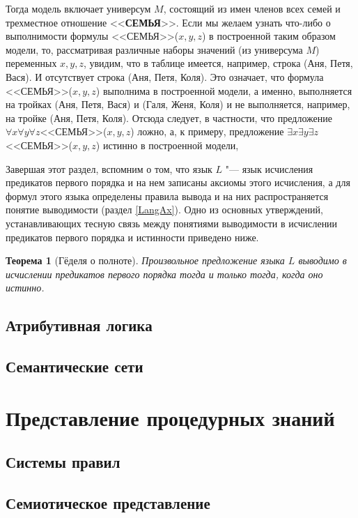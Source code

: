 \documentclass[b5paper,11pt]{book}
\newtheorem{Th}{Теорема}
\numberwithin{Def}{section}
\numberwithin{Th}{chapter}
\numberwithin{St}{chapter}
\begin{document}
	Тогда модель включает универсум $M$, состоящий из имен членов всех семей и трехместное отношение <<\textbf{СЕМЬЯ}>>. Если мы желаем узнать что-либо о выполнимости формулы <<СЕМЬЯ>>($x,y,z$) в построенной таким образом модели, то, рассматривая различные наборы значений (из универсума $M$) переменных $x,y,z$, увидим, что в таблице имеется, например, строка (Аня, Петя, Вася). И отсутствует строка (Аня, Петя, Коля). Это означает, что формула <<СЕМЬЯ>>($x,y,z$) выполнима  в построенной модели, а именно, выполняется на тройках (Аня, Петя, Вася) и (Галя, Женя, Коля) и не выполняется, например, на тройке (Аня, Петя, Коля). Отсюда следует, в частности, что предложение $\forall x\forall y\forall z$<<СЕМЬЯ>>($x,y,z$) ложно, а, к примеру, предложение $\exists x\exists y \exists z$<<СЕМЬЯ>>($x,y,z$) истинно в построенной модели,
	
	Завершая этот раздел, вспомним о том, что язык $L$ "--- язык исчисления предикатов первого порядка и на нем записаны аксиомы этого исчисления, а для формул этого языка определены правила вывода и на них распространяется понятие выводимости (раздел \ref{LangAx}). Одно из основных утверждений, устанавливающих тесную связь между понятиями выводимости в исчислении предикатов первого порядка и истинности приведено ниже. 
	
	\begin{Th}[Гёделя о полноте]
		Произвольное предложение языка $L$ выводимо в исчислении предикатов первого порядка тогда и только тогда, когда оно истинно.
	\end{Th}
	
	\section{Атрибутивная логика}
	\section{Семантические сети}
	


	\chapter{Представление процедурных знаний}
	
	\section{Системы правил}\label{sect_rules}
	\section{Семиотическое представление}
	
\end{document}
